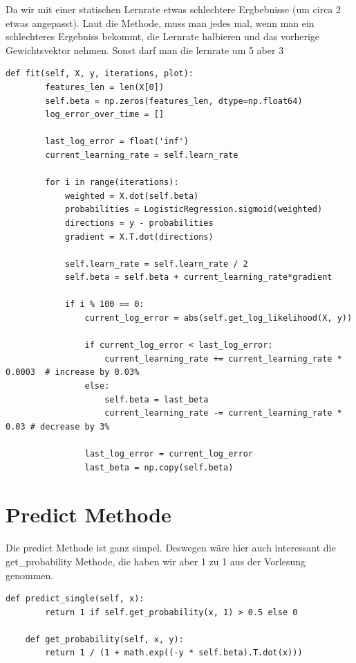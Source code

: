 Da wir mit einer statischen Lernrate etwas schlechtere
Ergbebnisse (um circa 2%
etwas angepasst). Laut die Methode, muss man jedes mal, wenn man ein schlechteres Ergebniss bekommt, die Lernrate
halbieren und das vorherige Gewichtsvektor nehmen. Sonst darf man die lernrate um 5%
aber 3%

\begin{lstlisting}[style=py]
def fit(self, X, y, iterations, plot):
        features_len = len(X[0])
        self.beta = np.zeros(features_len, dtype=np.float64)
        log_error_over_time = []

        last_log_error = float('inf')
        current_learning_rate = self.learn_rate

        for i in range(iterations):
            weighted = X.dot(self.beta)
            probabilities = LogisticRegression.sigmoid(weighted)
            directions = y - probabilities
            gradient = X.T.dot(directions)

            self.learn_rate = self.learn_rate / 2
            self.beta = self.beta + current_learning_rate*gradient

            if i % 100 == 0:
                current_log_error = abs(self.get_log_likelihood(X, y))

                if current_log_error < last_log_error:
                    current_learning_rate += current_learning_rate * 0.0003  # increase by 0.03%
                else:
                    self.beta = last_beta
                    current_learning_rate -= current_learning_rate * 0.03 # decrease by 3%

                last_log_error = current_log_error
                last_beta = np.copy(self.beta)
\end{lstlisting}

\section*{Predict Methode}

Die predict Methode ist ganz simpel. Deswegen wäre hier auch interessant die get\_probability Methode,
die haben wir aber 1 zu 1 aus der Vorlesung genommen.
\begin{lstlisting}[style=py]
    def predict_single(self, x):
        return 1 if self.get_probability(x, 1) > 0.5 else 0

    def get_probability(self, x, y):
        return 1 / (1 + math.exp((-y * self.beta).T.dot(x)))
\end{lstlisting}

